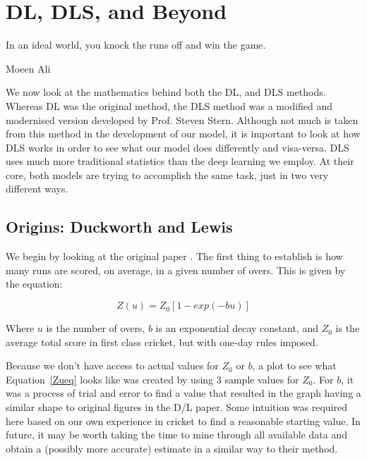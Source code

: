 \chapter{DL, DLS, and Beyond}

\epigraph{In an ideal world, you knock the runs off and win the game.}{Moeen Ali}

We now look at the mathematics behind both the DL, and DLS methods. Whereas DL was the original
method, the DLS method was a modified and modernised version developed by Prof. Steven Stern. Although not much is taken from this method 
in the development of our model, it is important to look at how DLS works in order to see what our model does differently 
and visa-versa. DLS uses much more traditional statistics than the deep learning we employ. At their core, both models are trying to accomplish 
the same task, just in two very different ways.

\section{Origins: Duckworth and Lewis}
We begin by looking at the original paper \cite{duckworth}. The first thing to establish is how many runs are scored,
on average, in a given number of overs. This is given by the equation:

\begin{equation}
    Z(u) = Z_0[1-exp(-bu)]
    \label{Zueq}  
\end{equation}

Where $u$ is the number of overs, $b$ is an exponential decay constant, and $Z_0$ is the
average total score in first class cricket, but with one-day rules imposed.  

Because we don't have access to actual values for $Z_0$ or $b$, a plot to see what Equation~\ref{Zueq} looks 
like was created by using 3 sample values for $Z_0$. For $b$, it was a process of trial and error to find a value
that resulted in the graph having a similar shape to original figures in the D/L paper. Some intuition was required here 
based on our own experience in cricket to find a reasonable starting value. In future, it may be worth taking the time to 
mine through all available data and obtain a (possibly more accurate) estimate in a similar way to their method. 

